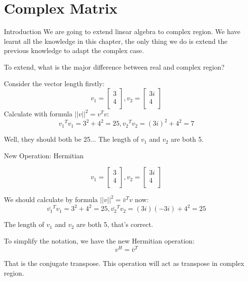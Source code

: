 \documentclass{beamer}
\begin{document}
\section{Complex Matrix}
\begin{frame}{Introduction}
We are going to extend linear algebra to complex region. We have learnt all the knowledge in this chapter, the only thing we do is extend the previous knowledge to adapt the complex case.

\vspace{3pt}
To extend, what is the major difference between real and complex region?

\vspace{3pt}
Consider the vector length firstly:
\begin{equation*}
    v_1=\left[ \begin{array}{c}
        3\\
        4\\
    \end{array} \right] , v_2=\left[ \begin{array}{c}
        3i\\
        4\\
    \end{array} \right]
\end{equation*}
Calculate with formula $||v||^2=v^Tv$:
\begin{equation*}
    {v_1}^Tv_1=3^2+4^2=25, {v_2}^Tv_2=\left( 3i \right) ^2+4^2=7
\end{equation*}

Well, they should both be 25... The length of $v_1$ and $v_2$ are both 5.
\end{frame}

\begin{frame}{New Operation: Hermitian}

\begin{equation*}
    v_1=\left[ \begin{array}{c}
        3\\
        4\\
    \end{array} \right] , v_2=\left[ \begin{array}{c}
        3i\\
        4\\
    \end{array} \right]
\end{equation*}

We should calculate by formula  $||v||^2=\bar{v}^Tv$ now:
\begin{equation*}
    {\bar{v_1}}^Tv_1=3^2+4^2=25, {\bar{v_2}}^Tv_2=\left( 3i \right) \left( -3i \right)+4^2=25
\end{equation*}

The length of $v_1$ and $v_2$ are both 5, that's correct.

\vspace{3pt}
To simplify the notation, we have the new Hermitian operation:
\begin{equation*}
    v^H={\bar{v}}^T
\end{equation*}

That is the conjugate transpose. This operation will act as transpose in complex region.
\end{frame}
\end{document}
